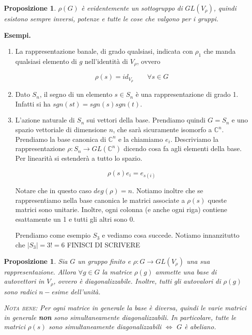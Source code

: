 \documentclass[11pt]{article}
\theoremstyle{plain}
\newtheorem{prop}[thm]{Proposizione}
\theoremstyle{definition}
\theoremstyle{remark}
\newcommand{\C}{\mathbb{C}}
\begin{document}
\begin{prop} $\rho(G)$ è evidentemente un sottogruppo di $GL(V_\rho)$, quindi esistono sempre inversi, potenze e tutte le cose che valgono per i gruppi.

\end{prop}


\textbf{Esempi.}
\begin{enumerate}
	\item La rappresentazione banale, di grado qualsiasi, indicata con $\rho_1$ che manda qualsiasi elemento di $g$ nell'identità di $V_\rho$, ovvero
	
	\[ \rho(s ) = id_{V_\rho} \qquad \forall s \in G\]
	\item Dato $S_n$, il segno di un elemento $s\in S_n$ è una rappresentazione di grado 1. Infatti si ha $sgn(st) = sgn(s) sgn(t)$.
	\item L'azione naturale di $S_n$ sui vettori della base. Prendiamo quindi $G = S_n$ e uno spazio vettoriale di dimensione $n$, che sarà sicuramente isomorfo a $\C^n$. Prendiamo la base canonica di $\C^n$ e la chiamiamo $e_i$. Descriviamo la rappresentazione $\rho: S_n \to GL(\C^n)$ dicendo cosa fa agli elementi della base. Per linearità si estenderà a tutto lo spazio.
	
	\[ \rho(s) e_i = e_{s(i)}\]
	
	Notare che in questo caso $deg(\rho) = n$. Notiamo inoltre che se rappresentiamo nella base canonica le matrici associate a $\rho(s)$ queste matrici sono unitarie. Inoltre, ogni colonna (e anche ogni riga) contiene esattamente un 1 e tutti gli altri sono 0.
	
	Prendiamo come esempio $S_3$ e vediamo cosa succede. Notiamo innanzitutto che $ |S_3| = 3! = 6$
	FINISCI DI SCRIVERE
\end{enumerate}





\begin{prop}
Sia $G$ un gruppo finito e $\rho: G \to GL(V_\rho)$ una sua rappresentazione. Allora $\forall g \in G$ la matrice $\rho(g)$ ammette una base di autovettori in $V_\rho$, ovvero è diagonalizzabile. Inoltre, tutti gli autovalori di $\rho(g)$ sono radici $n-$esime dell'unità.

\textsc{Nota bene:} Per ogni matrice in generale la base è diversa, quindi le varie matrici in generale \textbf{non} sono simultaneamente diagonalizzabili. In particolare, tutte le matrici $\rho(s)$ sono simultaneamente diagonalizzabili $\Leftrightarrow$ $G$ è abeliano. 

\label{prop:diagonalizzabilita rappresentazioni}
\end{prop}
\end{document}
